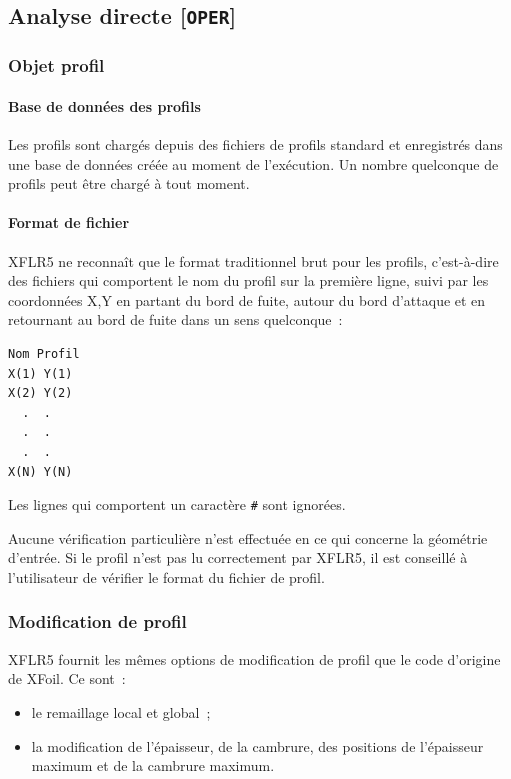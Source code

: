 \documentclass[a4paper,twoside,12pt,dvips]{article}
\begin{document}
\subsection{Analyse directe [\texttt{OPER}]}

\subsubsection{Objet profil}

\paragraph{Base de données des profils}

Les profils sont chargés depuis des fichiers de profils standard et enregistrés dans une base de données créée au moment de l’exécution. Un nombre quelconque de profils peut être chargé à tout moment.

\paragraph{Format de fichier}

XFLR5 ne reconnaît que le format traditionnel brut pour les profils, c’est-à-dire des fichiers qui comportent le nom du profil sur la première ligne, suivi par les coordonnées X,Y en partant du bord de fuite, autour du bord d’attaque et en retournant au bord de fuite dans un sens quelconque~:
\begin{verbatim}
Nom Profil
X(1) Y(1)
X(2) Y(2)
  .  .
  .  .
  .  .
X(N) Y(N)
\end{verbatim}

Les lignes qui comportent un caractère \texttt{\#} sont ignorées.

Aucune vérification particulière n’est effectuée en ce qui concerne la
géométrie d’entrée. Si le profil n’est pas lu correctement par XFLR5, il
est conseillé à l’utilisateur de vérifier le format du fichier de profil.

\subsubsection{Modification de profil}

XFLR5 fournit les mêmes options de modification de profil que le code
d’origine de XFoil. Ce sont~:
\begin{itemize}
  \item le remaillage local et global~;
  \item la modification de l’épaisseur, de la cambrure, des positions de
  l’épaisseur maximum et de la cambrure maximum.
\end{itemize}
\end{document}
